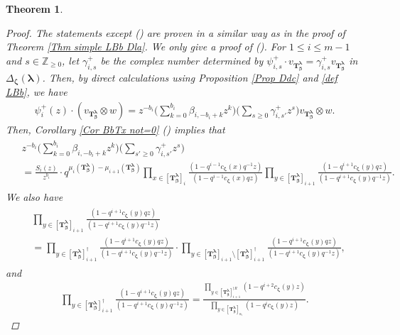 \documentclass[12pt]{amsart}
\newtheorem{thm}{Theorem}[section]
\numberwithin{equation}{thm}
\newcommand\ZZ{\mathbb Z}
\newcommand\bT{\mathbf T}
\renewcommand\a{\alpha}  %
\renewcommand\b{\beta}   %
\newcommand\g{\gamma}
\newcommand\D{\Delta}
\newcommand\Bb{\boldsymbol\beta}
\newcommand\Bz{\boldsymbol\zeta}
\newcommand\Bla{\boldsymbol\lambda}
\newcounter{ni}
\newcommand{\roii}{\roman{ni}}
\newcounter{roku}
\newcommand{\rovi}{\roman{roku}}
\begin{document}
\begin{thm}
\begin{proof}
The statements except (\rovi) are proven in a similar way as in the proof of Theorem \ref{Thm simple LBb Dla}. 
We only give a proof of (\rovi). 
For $1 \leq i \leq m-1$ and $s \in \ZZ_{\geq 0}$, 
let $\g_{i,s}^+ $ be the complex number determined by 
$\psi_{i,s}^+ \cdot v_{\bT_{\Bb}^{\Bla}} = \g_{i,s}^+ v_{\bT_{\Bb}^{\Bla}}$ in $\D_{\Bz} (\Bla)$.  
Then, by direct calculations using Proposition \ref{Prop Ddc} and \eqref{def LBb}, we have  
\begin{align}
\label{psii+z v bTbbBla w} 
\psi^+_{i}(z) \cdot (v_{\bT_{\Bb}^{\Bla}} \otimes w) 
=  z^{-b_i} \big( \sum_{k=0}^{b_i}   \b_{i, - b_i +k} z^{ k}  \big)
	\big( \sum_{s \geq 0} \g_{i, s'}^+ z^s \big) 
	v_{\bT_{\Bb}^{\Bla}} \otimes w.  
\end{align}
Then,  Corollary \ref{Cor BbTx not=0} (\roii) implies that  
\begin{align}
\label{lbwt BBb Bla} 
\begin{split}
&z^{-b_i} \big( \sum_{k=0}^{b_i}   \b_{i, - b_i +k} z^{ k}  \big)
	\big( \sum_{s' \geq 0} \g_{i, s'}^+ z^s \big)  
\\
&= \frac{S_i(z)}{z^{b_i}}  \cdot 
	q^{\mu_i (\bT_{\Bb}^{\Bla}) - \mu_{i+1} (\bT_{\Bb}^{\Bla})} 
	\prod_{x \in [\bT_{\Bb}^{\Bla}]_i}  \frac{(1 - q^{i-1} c_{\Bz} (x) q^{-1} z)}{ (1 - q^{i-1} c_{\Bz}(x) q z)} 
	\prod_{y \in [\bT_{\Bb}^{\Bla} ]_{i+1}} \frac{ (1 - q^{i+1} c_{\Bz} (y) q z )}{ (1 - q^{i+1} c_{\Bz} (y) q^{-1} z )}. 
\end{split}
\end{align}
We also have 
\begin{align}
\label{decom bTBbBla i+1} 
\begin{split}
&\prod_{y \in [\bT_{\Bb}^{\Bla} ]_{i+1}} \frac{ (1 - q^{i+1} c_{\Bz} (y) q z )}{ (1 - q^{i+1} c_{\Bz} (y) q^{-1} z )} 
\\
&= \prod_{y \in [\bT_{\Bb}^{\Bla} ]_{i+1}^{\dag} } \frac{ (1 - q^{i+1} c_{\Bz} (y) q z )}{ (1 - q^{i+1} c_{\Bz} (y) q^{-1} z )} 
	\cdot 
	\prod_{y \in [\bT_{\Bb}^{\Bla}]_{i+1} \setminus [\bT_{\Bb}^{\Bla}]_{i+1}^{\dag} } 
		\frac{ (1 - q^{i+1} c_{\Bz} (y) q z )}{ (1 - q^{i+1} c_{\Bz} (y) q^{-1} z )}, 
\end{split}
\end{align}
and 
\begin{align}
\label{prod bBb Bla i+1 dag}
\prod_{y \in [\bT_{\Bb}^{\Bla} ]_{i+1}^{\dag} } \frac{ (1 - q^{i+1} c_{\Bz} (y) q z )}{ (1 - q^{i+1} c_{\Bz} (y) q^{-1} z )}  
= \frac{ \prod_{y \in [\bT_{\Bb}^{\Bla}]_{i+1}^{\dag R}} (1 - q^{i+2} c_{\Bz}(y) z)}
		{\prod_{ y \in  [\bT_{\Bb}^{\Bla}]_{\a_i}} (1 - q^i c_{\Bz} (y) z)}. 
\end{align}


\end{proof}
\end{thm}
\end{document}
